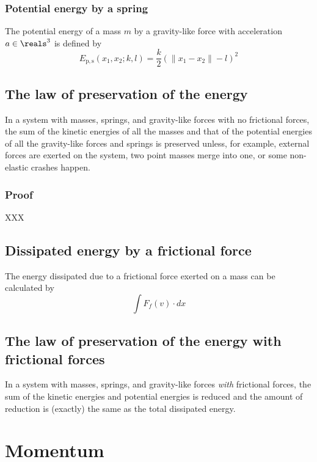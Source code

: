 \documentclass[12pt]{article}
\begin{document}
\subsubsection{Potential energy by a spring}

The potential energy of a mass $m$ by a gravity-like force with acceleration $a\in\reals^3$
is defined by
\begin{equation}
\label{eq:energy:potential:spring}
E_\mathrm{p,s}(x_1,x_2;k,l)
= \frac{k}{2} (\|x_1-x_2\|-l)^2
\end{equation}


\subsection{The law of preservation of the energy}

In a system with masses, springs, and gravity-like forces with no frictional forces,
the sum of the kinetic energies of all the masses
and that of the potential energies of all the gravity-like forces and springs
is preserved
unless, for example, external forces are exerted on the system,
two point masses merge into one,
or some non-elastic crashes happen.

\subsubsection{Proof}

XXX

\subsection{Dissipated energy by a frictional force}

The energy dissipated due to a frictional force exerted on a mass
can be calculated by
\begin{equation}
\int F_f(v) \cdot dx
\end{equation}

\subsection{The law of preservation of the energy with frictional forces}

In a system with masses, springs, and gravity-like forces \emph{with} frictional forces,
the sum of the kinetic energies and potential energies is reduced
and the amount of reduction is (exactly) the same as the total dissipated energy.


\section{Momentum}
\end{document}
